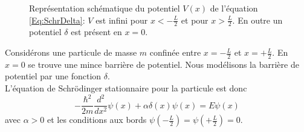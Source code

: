 \begin{figure}[h!]
\centering
{}
\caption{Représentation schématique du potentiel $V(x)$ de l'équation \eqref{Eq:SchrDelta}: $V$ est infini pour $x<-\frac{L}{2}$ et pour $x>\frac{L}{2}$. En outre un potentiel $\delta$ est présent en $x=0$.}
\end{figure}

Considérons une particule de masse $m$ confinée entre $x= -\frac{L}{2}$ et $x =+\frac{L}{2}$. En $x=0$ se trouve une mince barrière de potentiel. Nous modélisons la barrière de potentiel par une fonction $\delta$. \\

L'équation de Schrödinger stationnaire pour la particule est donc
\begin{equation}
-\frac{\hbar^2}{2m} \frac{d^2}{d x^2} \psi(x) + \alpha \delta(x) \psi(x)= E \psi(x)
\label{Eq:SchrDelta}
\end{equation}
avec $\alpha>0$ et les conditions aux bords $\psi(-\frac{L}{2})=\psi(+\frac{L}{2})=0$.


